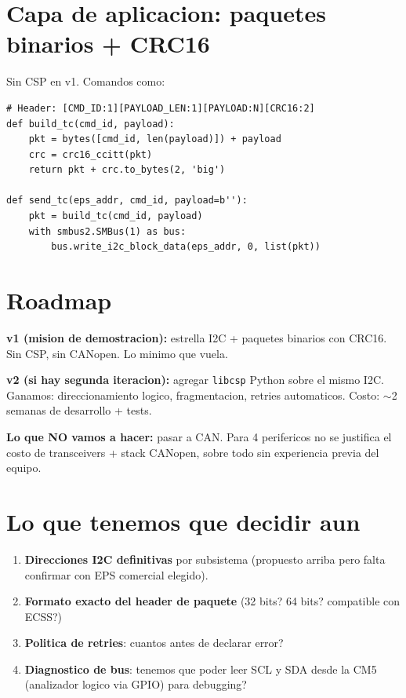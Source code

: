 \documentclass[11pt,a4paper,oneside,openright]{book}
\begin{document}
\section{Capa de aplicacion: paquetes binarios + CRC16}

Sin CSP en v1. Comandos como:

\begin{lstlisting}[style=py, caption=Estructura de telecomando hacia EPS]
# Header: [CMD_ID:1][PAYLOAD_LEN:1][PAYLOAD:N][CRC16:2]
def build_tc(cmd_id, payload):
    pkt = bytes([cmd_id, len(payload)]) + payload
    crc = crc16_ccitt(pkt)
    return pkt + crc.to_bytes(2, 'big')

def send_tc(eps_addr, cmd_id, payload=b''):
    pkt = build_tc(cmd_id, payload)
    with smbus2.SMBus(1) as bus:
        bus.write_i2c_block_data(eps_addr, 0, list(pkt))
\end{lstlisting}

\section{Roadmap}

\begin{logrado}
\textbf{v1 (mision de demostracion):} estrella I2C + paquetes binarios
con CRC16. Sin CSP, sin CANopen. Lo minimo que vuela.

\textbf{v2 (si hay segunda iteracion):} agregar \texttt{libcsp}
Python sobre el mismo I2C. Ganamos: direccionamiento logico,
fragmentacion, retries automaticos. Costo: $\sim$2 semanas de
desarrollo + tests.

\textbf{Lo que NO vamos a hacer:} pasar a CAN. Para 4 perifericos no
se justifica el costo de transceivers + stack CANopen, sobre todo
sin experiencia previa del equipo.
\end{logrado}

\section{Lo que tenemos que decidir aun}

\begin{enumerate}[leftmargin=2em]
  \item \textbf{Direcciones I2C definitivas} por subsistema (propuesto
    arriba pero falta confirmar con EPS comercial elegido).
  \item \textbf{Formato exacto del header de paquete} (32 bits? 64
    bits? compatible con ECSS?)
  \item \textbf{Politica de retries}: cuantos antes de declarar
    error?
  \item \textbf{Diagnostico de bus}: tenemos que poder leer SCL y SDA
    desde la CM5 (analizador logico via GPIO) para debugging?
\end{enumerate}
\end{document}
